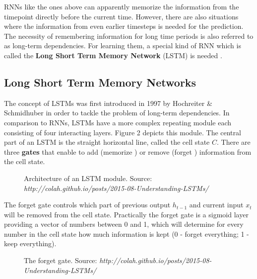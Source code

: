 \documentclass[11pt,a4paper,bibliography=totocnumbered,listof=totocnumbered]{scrartcl}
\begin{document}
RNNs like the ones above can apparently \glqq memorize \grqq the information from the timepoint directly before the current time. However, there are also situations where the information from even earlier timesteps is needed for the prediction. The necessity of remembering information for long time periods is also referred to as long-term dependencies. For learning them,  a special kind of RNN which is called the \textbf{Long Short Term Memory Network} (LSTM) is needed \cite{Goodfellow-et-al-2016, lstm_colah}.

\subsection{Long Short Term Memory Networks}
The concept of LSTMs was first introduced in 1997 by Hochreiter \& Schmidhuber \cite{hochreiter1997long} in order to tackle the problem of long-term dependencies.  
In comparison to RNNs, LSTMs have a more complex repeating module each consisting of four interacting layers. 
Figure 2 depicts this module. The central part of an LSTM is the straight horizontal line, called the cell state $C$. There are three \textbf{gates} that enable to add (\glqq memorize \grqq) or remove (\glqq forget \grqq) information from the cell state. 

	\begin{figure}[H] 
		\label{fig:cell_state}
		\caption{Architecture of an LSTM module. Source: \textit{http://colah.github.io/posts/2015-08-Understanding-LSTMs/}}
	\end{figure}

The forget gate controls which part of previous output $h_{t-1}$ and current input $x_t$ will be removed from the cell state. Practically the forget gate is a sigmoid layer providing a vector of numbers between 0 and 1, which will determine for every number in the cell state how much information is kept (0 - forget everything; 1 - keep everything).

	\begin{figure}[h!] 
		\label{fig:forget}
		\caption{The forget gate. Source: \textit{http://colah.github.io/posts/2015-08-Understanding-LSTMs/}}
	\end{figure}
\end{document}
